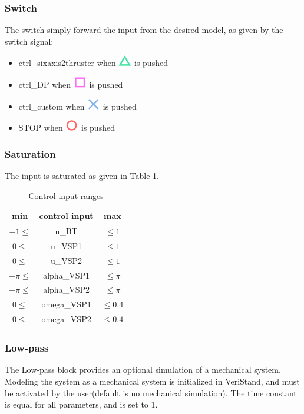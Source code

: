 \subsubsection{Switch}
The switch simply forward the input from the desired model, as given by the switch signal:
\begin{itemize}
	\item ctrl\_sixaxis2thruster when \includegraphics[scale=0.4]{fig/sixaxis_triangle} is pushed
	\item ctrl\_DP when \includegraphics[scale=0.4]{fig/sixaxis_square} is pushed
	\item ctrl\_custom when \includegraphics[scale=0.4]{fig/sixaxis_cross} is pushed
	\item STOP when \includegraphics[scale=0.4]{fig/sixaxis_circle} is pushed
\end{itemize}
\subsubsection{Saturation}
The input is saturated as given in Table \ref{tab:input_saturation}. 
\begin{table}
	\caption{Control input ranges}
	\centering
	\begin{tabular}{ccc}
		\toprule 
		min & control input & max\tabularnewline
		\midrule
		$-1\leq$ & u\_BT & $\leq1$\tabularnewline
		$0\leq$ & u\_VSP1 & $\leq1$\tabularnewline
		$0\leq$ & u\_VSP2 & $\leq1$\tabularnewline
		$-\pi\leq$ & alpha\_VSP1 & $\leq\pi$\tabularnewline
		$-\pi\leq$ & alpha\_VSP2 & $\leq\pi$\tabularnewline
		$0\leq$ & omega\_VSP1 & $\leq0.4$\tabularnewline
		$0\leq$ & omega\_VSP2 & $\leq0.4$\tabularnewline
	\end{tabular}
	\label{tab:input_saturation}
\end{table}
\subsubsection{Low-pass}
The Low-pass block provides an optional simulation of a mechanical system. Modeling the system as a mechanical system is initialized in VeriStand, and must be activated by the user(default is no mechanical simulation). The time constant is equal for all parameters, and is set to 1. 
